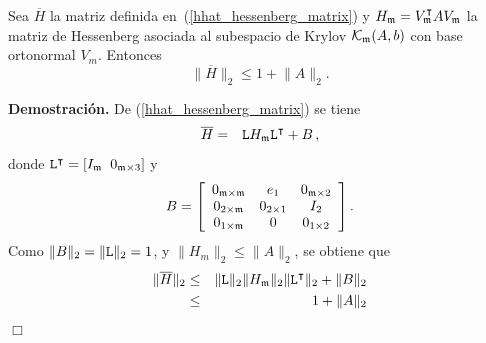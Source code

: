 \begin{lemma}\cite{naranjo2021locally}\label{H-bound}
	Sea $\overline{H}$ la matriz definida en~(\ref{hhat_hessenberg_matrix}) y $H_{\mathfrak{m}}=V^\intercal_{\mathfrak{m}} AV_{\mathfrak{m}}$ la matriz de Hessenberg asociada al subespacio de Krylov $\mathcal{K}_{\mathfrak{m}}(A,b)$ con base ortonormal $V_m$. Entonces
	\[ \lVert\overline{H}\rVert_2 \leq 1 +  \lVert A\rVert_2. \]
\end{lemma}
\textbf{Demostración.}
De (\ref{hhat_hessenberg_matrix}) se tiene
\begin{eqnarray*}
	\overline{H}&=&\mathtt{L} H_{\mathfrak{m}} \mathtt{L}^\intercal + B\,,
\end{eqnarray*}
donde $ \mathtt{L}^\intercal=[I_{\mathfrak{m}} \;\; 0_{\mathfrak{m}\times 3}] $ y
\[B=\left[\begin{array}{ccc}
0_{\mathfrak{m}\times\mathfrak{m}} & e_1 & 0_{\mathfrak{m} \times 2}\\
0_{2\times\mathfrak{m}} & 0_{2 \times 1} & I_2\\
0_{1\times\mathfrak{m}} & 0 & 0_{1\times 2}
\end{array}\right].\]
Como $\lVert B\rVert_2 = \lVert \mathtt{L} \rVert_2 = 1$, y $\lVert H_m\rVert_2 \le \lVert A \rVert_2$, se obtiene que
\begin{eqnarray*}
	\lVert\overline{H}\rVert_2 &\leq& \lVert \mathtt{L} \rVert_2 \lVert H_{\mathfrak{m}} \rVert_2 \lVert \mathtt{L}^\intercal \rVert_2 + \lVert B \rVert_2\\
	&\leq& 1 + \lVert A\rVert_2
\end{eqnarray*}
$\Box$\\ \\


